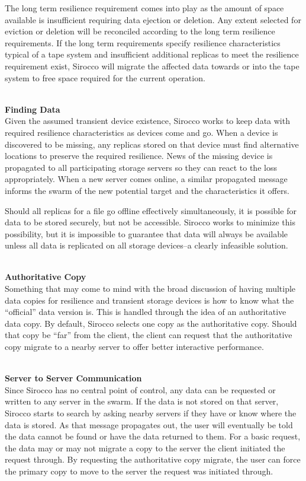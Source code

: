 The long term resilience requirement comes into play as the amount of space
available is insufficient requiring data ejection or deletion. Any extent
selected for eviction or deletion will be reconciled according to the long term
resilience requirements. If the long term requirements specify resilience
characteristics typical of a tape system and insufficient additional replicas
to meet the resilience requirement exist, Sirocco will migrate the affected
data towards or into the tape system to free space required for the current
operation.

~\\\noindent\textbf{Finding Data}\\
Given the assumed transient device existence, Sirocco works to keep data with
required resilience characteristics as devices come and go. When a device is
discovered to be missing, any replicas stored on that device must find
alternative locations to preserve the required resilience. News of the missing
device is propagated to all participating storage servers so they can react to
the loss appropriately. When a new server comes online, a similar propagated
message informs the swarm of the new potential target and the characteristics
it offers.

Should all replicas for a file go offline effectively simultaneously, it is
possible for data to be stored securely, but not be accessible. Sirocco works
to minimize this possibility, but it is impossible to guarantee that data will
always be available unless all data is replicated on all storage devices--a
clearly infeasible solution.

~\\\noindent\textbf{Authoritative Copy}\\
Something that may come to mind with the broad discussion of having multiple
data copies for resilience and transient storage devices is how to know what
the ``official'' data version is. This is handled through the idea of an
authoritative data copy. By default, Sirocco selects one copy as the
authoritative copy. Should that copy be ``far'' from the client, the client can
request that the authoritative copy migrate to a nearby server to offer better
interactive performance.

~\\\noindent\textbf{Server to Server Communication}\\
Since Sirocco has no central point of control, any data can be requested or
written to any server in the swarm. If the data is not stored on that server,
Sirocco starts to search by asking nearby servers if they have or know where
the data is stored. As that message propagates out, the user will eventually be
told the data cannot be found or have the data returned to them. For a basic
request, the data may or may not migrate a copy to the server the client
initiated the request through. By requesting the authoritative copy migrate,
the user can force the primary copy to move to the server the request was
initiated through.

